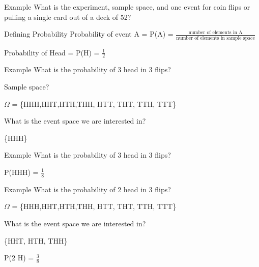 \documentclass[presentation]{beamer}
\begin{document}
\begin{frame}[label={sec:org202bf1d}]{Example}
What is the experiment, sample space, and one event for coin flips or pulling a single card out of a deck of 52?
\end{frame}

\begin{frame}[label={sec:orgee3abfc}]{Defining Probability}
Probability of event A = P(A) = \(\frac{\text{number of elements in A}}{\text{number of elements in sample space}}\)

\pause

Probability of Head = P(H) = \(\frac{1}{2}\)
\end{frame}


\begin{frame}[label={sec:org59c281a}]{Example}
What is the probability of 3 head in 3 flips?

Sample space?

\pause

\(\Omega\) = \{HHH,HHT,HTH,THH, HTT, THT, TTH, TTT\}

\pause

What is the event space we are interested in?

\pause

\{HHH\}
\end{frame}

\begin{frame}[label={sec:org5e0b658}]{Example}
What is the probability of 3 head in 3 flips?


\pause

P(HHH) = \(\frac{1}{8}\)
\end{frame}


\begin{frame}[label={sec:org24e8236}]{Example}
What is the probability of 2 head in 3 flips?

\(\Omega\) = \{HHH,HHT,HTH,THH, HTT, THT, TTH, TTT\}

What is the event space we are interested in?

\pause

\{HHT, HTH, THH\}

\pause

P(2 H) = \(\frac{3}{8}\)
\end{frame}
\end{document}
